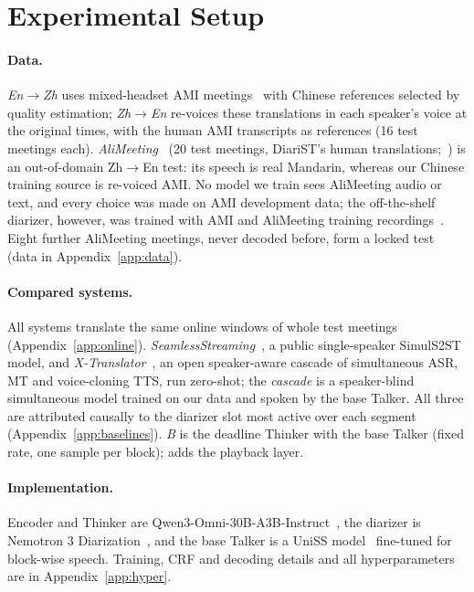 \section{Experimental Setup}
\label{sec:setup}

\paragraph{Data.} \emph{En$\rightarrow$Zh} uses mixed-headset AMI meetings~\citep{carletta2005ami} with Chinese
references selected by quality estimation; \emph{Zh$\rightarrow$En} re-voices these translations in each speaker's voice
at the original times, with the human AMI transcripts as references (16 test meetings each). \emph{AliMeeting}~\citep{yu2022m2met}
(20 test meetings, DiariST's human translations;~\citealp{yang2024diarist}) is an out-of-domain Zh$\rightarrow$En test:
its speech is real Mandarin, whereas our Chinese training source is re-voiced AMI. No model we train sees AliMeeting
audio or text, and every choice was made on AMI development data; the off-the-shelf diarizer, however, was trained
with AMI and AliMeeting training recordings~\citep{medennikov2026nemotron}. Eight further AliMeeting meetings, never
decoded before, form a locked test (data in Appendix~\ref{app:data}).

\paragraph{Compared systems.} All systems translate the same online windows of whole test meetings
(Appendix~\ref{app:online}). \emph{SeamlessStreaming}~\citep{seamless2023}, a public single-speaker SimulS2ST model, and
\emph{X-Translator}~\citep{zhao2026xtranslator}, an open speaker-aware cascade of simultaneous ASR, MT and voice-cloning
TTS, run zero-shot; the \emph{cascade} is a speaker-blind simultaneous model trained on our data and spoken by the base
Talker. All three are attributed causally to the diarizer slot most active over each segment
(Appendix~\ref{app:baselines}). \emph{B} is the deadline Thinker with the base Talker (fixed rate, one sample per
block); \sys{} adds the playback layer.

\paragraph{Implementation.} Encoder and Thinker are Qwen3-Omni-30B-A3B-Instruct~\citep{xu2025qwen3omni}, the diarizer
is Nemotron 3 Diarization~\citep{medennikov2026nemotron}, and the base Talker is a UniSS model~\citep{uniss2025}
fine-tuned for block-wise speech. Training, CRF and decoding details and all hyperparameters are in
Appendix~\ref{app:hyper}.


